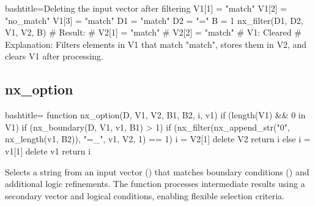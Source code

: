 \begin{NexCodeBox}{bash}{title={Deleting the input vector after filtering}}
	V1[1] = "match"
	V1[2] = "no_match"
	V1[3] = "match"
	D1 = "match"
	D2 = "="
	B = 1
	nx_filter(D1, D2, V1, V2, B)
	# Result:
	# V2[1] = "match"
	# V2[2] = "match"
	# V1: Cleared
	# Explanation: Filters elements in V1 that match "match", stores them in V2, and clears V1 after processing.
\end{NexCodeBox}

\newpage
\subsection{nx_option}
\label{nx_option}
\begin{NexCodeBox}{bash}{title={}}
function nx_option(D, V1, V2, B1, B2,   i, v1)
{
	if (length(V1) && 0 in V1) {
		if (nx_boundary(D, V1, v1, B1) > 1) {
			if (nx_filter(nx_append_str("0", nx_length(v1, B2)), "=_", v1, V2, 1) == 1) {
				i = V2[1]
				delete V2
				return i
			}
		} else {
			i = v1[1]
			delete v1
			return i
		}
	}
}
\end{NexCodeBox}

\begin{NexMainBox}
	\begin{NexMainBox}
		Selects a string from an input vector () that matches boundary conditions () and additional logic refinements. The function processes intermediate results using a secondary vector and logical conditions, enabling flexible selection criteria.
	\end{NexMainBox}
	\begin{NexMainBox}
		\begin{NexListDark}
		\end{NexListDark}
	\end{NexMainBox}
\end{NexMainBox}

